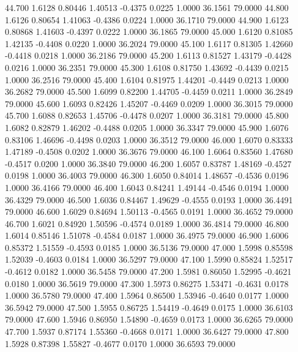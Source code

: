  44.700   1.6128   0.80446   1.40513  -0.4375   0.0225   1.0000  36.1561  79.0000
  44.800   1.6126   0.80654   1.41063  -0.4386   0.0224   1.0000  36.1710  79.0000
  44.900   1.6123   0.80868   1.41603  -0.4397   0.0222   1.0000  36.1865  79.0000
  45.000   1.6120   0.81085   1.42135  -0.4408   0.0220   1.0000  36.2024  79.0000
  45.100   1.6117   0.81305   1.42660  -0.4418   0.0218   1.0000  36.2186  79.0000
  45.200   1.6113   0.81527   1.43179  -0.4428   0.0216   1.0000  36.2351  79.0000
  45.300   1.6108   0.81750   1.43692  -0.4439   0.0215   1.0000  36.2516  79.0000
  45.400   1.6104   0.81975   1.44201  -0.4449   0.0213   1.0000  36.2682  79.0000
  45.500   1.6099   0.82200   1.44705  -0.4459   0.0211   1.0000  36.2849  79.0000
  45.600   1.6093   0.82426   1.45207  -0.4469   0.0209   1.0000  36.3015  79.0000
  45.700   1.6088   0.82653   1.45706  -0.4478   0.0207   1.0000  36.3181  79.0000
  45.800   1.6082   0.82879   1.46202  -0.4488   0.0205   1.0000  36.3347  79.0000
  45.900   1.6076   0.83106   1.46696  -0.4498   0.0203   1.0000  36.3512  79.0000
  46.000   1.6070   0.83333   1.47189  -0.4508   0.0202   1.0000  36.3676  79.0000
  46.100   1.6064   0.83560   1.47680  -0.4517   0.0200   1.0000  36.3840  79.0000
  46.200   1.6057   0.83787   1.48169  -0.4527   0.0198   1.0000  36.4003  79.0000
  46.300   1.6050   0.84014   1.48657  -0.4536   0.0196   1.0000  36.4166  79.0000
  46.400   1.6043   0.84241   1.49144  -0.4546   0.0194   1.0000  36.4329  79.0000
  46.500   1.6036   0.84467   1.49629  -0.4555   0.0193   1.0000  36.4491  79.0000
  46.600   1.6029   0.84694   1.50113  -0.4565   0.0191   1.0000  36.4652  79.0000
  46.700   1.6021   0.84920   1.50596  -0.4574   0.0189   1.0000  36.4814  79.0000
  46.800   1.6014   0.85146   1.51078  -0.4584   0.0187   1.0000  36.4975  79.0000
  46.900   1.6006   0.85372   1.51559  -0.4593   0.0185   1.0000  36.5136  79.0000
  47.000   1.5998   0.85598   1.52039  -0.4603   0.0184   1.0000  36.5297  79.0000
  47.100   1.5990   0.85824   1.52517  -0.4612   0.0182   1.0000  36.5458  79.0000
  47.200   1.5981   0.86050   1.52995  -0.4621   0.0180   1.0000  36.5619  79.0000
  47.300   1.5973   0.86275   1.53471  -0.4631   0.0178   1.0000  36.5780  79.0000
  47.400   1.5964   0.86500   1.53946  -0.4640   0.0177   1.0000  36.5942  79.0000
  47.500   1.5955   0.86725   1.54419  -0.4649   0.0175   1.0000  36.6103  79.0000
  47.600   1.5946   0.86950   1.54890  -0.4659   0.0173   1.0000  36.6265  79.0000
  47.700   1.5937   0.87174   1.55360  -0.4668   0.0171   1.0000  36.6427  79.0000
  47.800   1.5928   0.87398   1.55827  -0.4677   0.0170   1.0000  36.6593  79.0000
